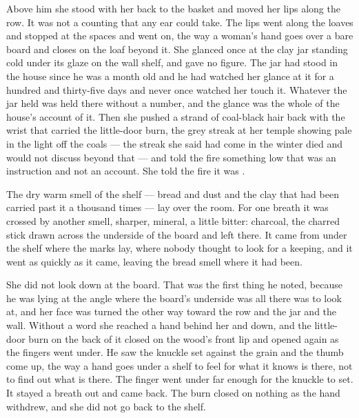 Above him she stood with her back to the basket and moved her lips along the row. It was not a counting that any ear could take. The lips went along the loaves and stopped at the spaces and went on, the way a woman's hand goes over a bare board and closes on the loaf beyond it. She glanced once at the clay jar standing cold under its glaze on the wall shelf, and gave no figure. The jar had stood in the house since he was a month old and he had watched her glance at it for a hundred and thirty-five days and never once watched her touch it. Whatever the jar held was held there without a number, and the glance was the whole of the house's account of it. Then she pushed a strand of coal-black hair back with the wrist that carried the little-door burn, the grey streak at her temple showing pale in the light off the coals --- the streak she said had come in the winter  died and would not discuss beyond that --- and told the fire something low that was an instruction and not an account. She told the fire it was .

The dry warm smell of the shelf --- bread and dust and the clay that had been carried past it a thousand times --- lay over the room. For one breath it was crossed by another smell, sharper, mineral, a little bitter: charcoal, the charred stick drawn across the underside of the board and left there. It came from under the shelf where the marks lay, where nobody thought to look for a keeping, and it went as quickly as it came, leaving the bread smell where it had been.

She did not look down at the board. That was the first thing he noted, because he was lying at the angle where the board's underside was all there was to look at, and her face was turned the other way toward the row and the jar and the wall. Without a word she reached a hand behind her and down, and the little-door burn on the back of it closed on the wood's front lip and opened again as the fingers went under. He saw the knuckle set against the grain and the thumb come up, the way a hand goes under a shelf to feel for what it knows is there, not to find out what is there. The finger went under far enough for the knuckle to set. It stayed a breath out and came back. The burn closed on nothing as the hand withdrew, and she did not go back to the shelf.

\scenebreak


